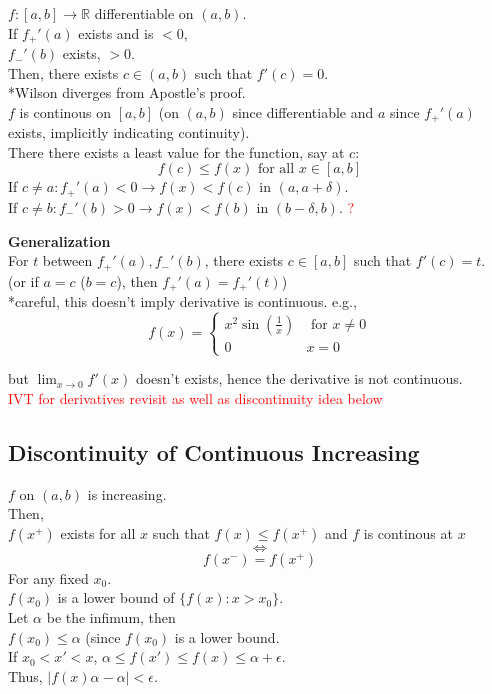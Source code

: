 \documentclass[12pt]{article}
\begin{document}
$f: [a, b] \rightarrow \mathbb{R}$ differentiable on $(a, b)$.\\
If $f_+'(a)$ exists and is $< 0$, \\
$f_-'(b)$ exists, $> 0$.\\
Then, there exists $c \in (a, b)$ such that $f'(c) = 0$.\\
*Wilson diverges from Apostle's proof.\\
\textcolor[gray]{0.5}{$f$ is continous on $[a, b]$ (on $(a, b)$ since differentiable and $a$ since $f_+'(a)$ exists, implicitly indicating continuity).\\
There there exists a least value for the function, say at $c$: 
$$f(c) \leq f(x) \text{ for all } x \in [a, b]$$
If $c \neq a: f_+'(a) < 0 \rightarrow f(x) < f(c) $ in $(a , a + \delta)$.\\
If $c \neq b: f_-'(b) > 0 \rightarrow f(x) < f(b) \text{ in } (b -\delta, b)$.
\textcolor{red}{?}
}

\textbf{Generalization} \\
For $t$ between $f_+'(a), f_-'(b)$, there exists $c \in [a, b]$ such that $f'(c) = t.$\\
(or if $a = c$ ($b=c$), then $f_+'(a) = f_+'(t)$)\\

*careful, this doesn't imply derivative is continuous.
e.g., 
\begin{displaymath}
   f(x) = \left\{
     \begin{array}{lr}
       x^2 \sin(\frac{1}{x}) & \text{ for } x \neq 0\\
       0 & x = 0
     \end{array}
   \right.
\end{displaymath}

but $\lim_{x \rightarrow 0} f'(x)$ doesn't exists, hence the derivative is not continuous.\\
\textcolor{red}{IVT for derivatives revisit as well as discontinuity idea below}

\subsection*{Discontinuity of Continuous Increasing}

$f$ on $(a, b)$ is increasing. \\
Then,\\
$f(x^+)$ exists for all $x$ such that $f(x) \leq f(x^+)$ and $f$ is continous at $x$ $$\iff$$ $$f(x^-) = f(x^+)$$
\textcolor[gray]{0.5}{For any fixed $x_0$.\\
$f(x_0)$ is a lower bound of $\{f(x) : x > x_0\}$.\\
Let $\alpha$ be the infimum, then \\
$f(x_0) \leq \alpha$ (since $f(x_0)$ is a lower bound.\\
If $x_0 < x' < x$, 
$\alpha \leq f(x') \leq f(x) \leq \alpha + \epsilon$.\\
Thus, $|f(x) \alpha - \alpha | < \epsilon$.\\
}
\end{document}

